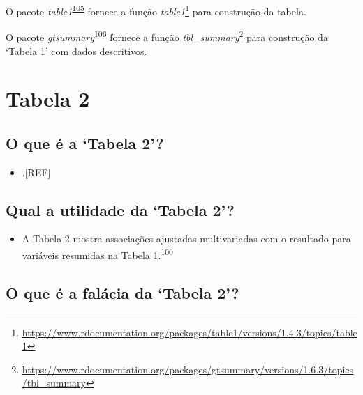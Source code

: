 \documentclass[
  a4paper,
]{book}
\providecommand{\tightlist}{%
  \setlength{\itemsep}{0pt}\setlength{\parskip}{0pt}}
\renewcommand{\href}[2]{#2\footnote{\url{#1}}}
\newenvironment{infobox}[1]
  {
  \begin{itemize}
  \renewcommand{\labelitemi}{
    \raisebox{-.7\height}[0pt][0pt]{
      {\setkeys{Gin}{width=3em,keepaspectratio}
        \texttt{[image: \#1]}}
    }
  }
  \setlength{\fboxsep}{1em}
  \begin{blackbox}
  \item
  }
  {
  \end{blackbox}
  \end{itemize}
  }
\begin{document}
\begin{infobox}{images/Rlogo}
O pacote \emph{table1}\textsuperscript{\protect\hyperlink{ref-table1}{105}} fornece a função \href{https://www.rdocumentation.org/packages/table1/versions/1.4.3/topics/table1}{\emph{table1}} para construção da tabela.

\end{infobox}

\begin{infobox}{images/Rlogo}
O pacote \emph{gtsummary}\textsuperscript{\protect\hyperlink{ref-gtsummary-2}{106}} fornece a função \href{https://www.rdocumentation.org/packages/gtsummary/versions/1.6.3/topics/tbl_summary}{\emph{tbl\_summary}} para construção da `Tabela 1' com dados descritivos.

\end{infobox}

\hypertarget{tabela-2}{%
\section{Tabela 2}\label{tabela-2}}

\hypertarget{o-que-uxe9-a-tabela-2}{%
\subsection{O que é a `Tabela 2'?}\label{o-que-uxe9-a-tabela-2}}

\begin{itemize}
\tightlist
\item
  .{[}REF{]}
\end{itemize}

\hypertarget{qual-a-utilidade-da-tabela-2}{%
\subsection{Qual a utilidade da `Tabela 2'?}\label{qual-a-utilidade-da-tabela-2}}

\begin{itemize}
\tightlist
\item
  A Tabela 2 mostra associações ajustadas multivariadas com o resultado para variáveis resumidas na Tabela 1.\textsuperscript{\protect\hyperlink{ref-Westreich2013}{100}}
\end{itemize}

\hypertarget{o-que-uxe9-a-faluxe1cia-da-tabela-2}{%
\subsection{O que é a falácia da `Tabela 2'?}\label{o-que-uxe9-a-faluxe1cia-da-tabela-2}}
\end{document}
